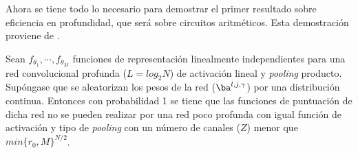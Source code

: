Ahora se tiene todo lo necesario para demostrar el primer resultado sobre eficiencia en profundidad, que será sobre circuitos aritméticos. Esta demostración proviene de \cite{DBLP:journals/corr/CohenSS15a}.

\begin{teorema} \label{teo:efiProfCto}
Sean $f_{\theta_1},\cdots ,f_{\theta_M}$ funciones de representación linealmente independientes para una red convolucional profunda ($L = log_2 N$) de activación lineal y \textit{pooling} producto. Supóngase que se aleatorizan los pesos de la red ($\ba^{l,j,\gamma}$) por una distribución continua. Entonces con probabilidad 1 se tiene que las funciones de puntuación de dicha red no se pueden realizar por una red poco profunda con igual función de activación y tipo de \textit{pooling} con un número de canales ($Z$) menor que $min\{r_0,M\}^{N/2}$.
\end{teorema} 
